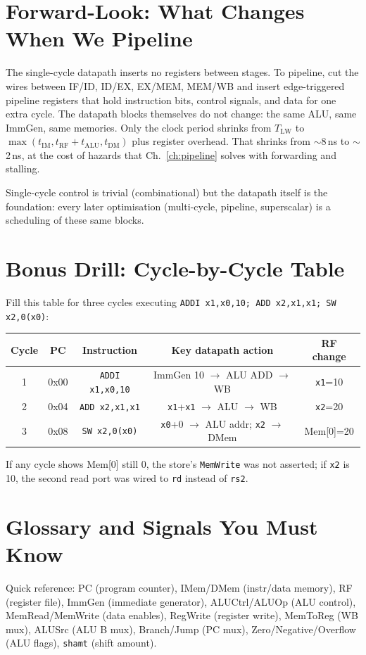 \section{Forward-Look: What Changes When We Pipeline}
The single-cycle datapath inserts no registers between stages. To pipeline, cut the wires between IF/ID, ID/EX, EX/MEM, MEM/WB and insert edge-triggered pipeline registers that hold instruction bits, control signals, and data for one extra cycle. The datapath blocks themselves do not change: the same ALU, same ImmGen, same memories. Only the clock period shrinks from $T_{\text{LW}}$ to $\max(t_{\text{IM}},t_{\text{RF}}+t_{\text{ALU}},t_{\text{DM}})$ plus register overhead. That shrinks from $\sim$8\,ns to $\sim$2\,ns, at the cost of hazards that Ch.~\ref{ch:pipeline} solves with forwarding and stalling.

Single-cycle control is trivial (combinational) but the datapath itself is the foundation: every later optimisation (multi-cycle, pipeline, superscalar) is a scheduling of these same blocks.


\section{Bonus Drill: Cycle-by-Cycle Table}
Fill this table for three cycles executing \texttt{ADDI x1,x0,10; ADD x2,x1,x1; SW x2,0(x0)}:

\begin{center}
\scriptsize
\begin{tabular}{c|c|c|c|c}
\toprule Cycle & PC & Instruction & Key datapath action & RF change \\ \midrule
1 & 0x00 & \texttt{ADDI x1,x0,10} & ImmGen 10 $\to$ ALU ADD $\to$ WB & \texttt{x1}=10 \\
2 & 0x04 & \texttt{ADD x2,x1,x1} & \texttt{x1}+\texttt{x1} $\to$ ALU $\to$ WB & \texttt{x2}=20 \\
3 & 0x08 & \texttt{SW x2,0(x0)} & \texttt{x0}+0 $\to$ ALU addr; \texttt{x2} $\to$ DMem & Mem[0]=20 \\ \bottomrule
\end{tabular}
\end{center}
If any cycle shows Mem[0] still 0, the store's \texttt{MemWrite} was not asserted; if \texttt{x2} is 10, the second read port was wired to \texttt{rd} instead of \texttt{rs2}.


\section{Glossary and Signals You Must Know}
Quick reference: PC (program counter), IMem/DMem (instr/data memory), RF (register file), ImmGen (immediate generator), ALUCtrl/ALUOp (ALU control), MemRead/MemWrite (data enables), RegWrite (register write), MemToReg (WB mux), ALUSrc (ALU B mux), Branch/Jump (PC mux), Zero/Negative/Overflow (ALU flags), \texttt{shamt} (shift amount).

